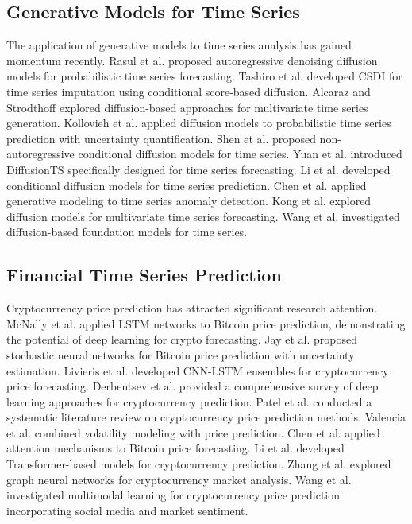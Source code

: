 \documentclass[11pt,a4paper]{article}
\begin{document}
\subsection{Generative Models for Time Series}

The application of generative models to time series analysis has gained momentum recently. Rasul et al. \cite{rasul2021autoregressive} proposed autoregressive denoising diffusion models for probabilistic time series forecasting. Tashiro et al. \cite{tashiro2021csdi} developed CSDI for time series imputation using conditional score-based diffusion. Alcaraz and Strodthoff \cite{alcaraz2023diffusion} explored diffusion-based approaches for multivariate time series generation. Kollovieh et al. \cite{kollovieh2023predict} applied diffusion models to probabilistic time series prediction with uncertainty quantification. Shen et al. \cite{shen2023nondiffusion} proposed non-autoregressive conditional diffusion models for time series. Yuan et al. \cite{yuan2024diffusionts} introduced DiffusionTS specifically designed for time series forecasting. Li et al. \cite{li2024diffusion} developed conditional diffusion models for time series prediction. Chen et al. \cite{chen2024generative} applied generative modeling to time series anomaly detection. Kong et al. \cite{kong2024diffusion} explored diffusion models for multivariate time series forecasting. Wang et al. \cite{wang2024timeseries} investigated diffusion-based foundation models for time series.

\subsection{Financial Time Series Prediction}

Cryptocurrency price prediction has attracted significant research attention. McNally et al. \cite{mcnally2018predicting} applied LSTM networks to Bitcoin price prediction, demonstrating the potential of deep learning for crypto forecasting. Jay et al. \cite{jay2020stochastic} proposed stochastic neural networks for Bitcoin price prediction with uncertainty estimation. Livieris et al. \cite{livieris2020cnn} developed CNN-LSTM ensembles for cryptocurrency price forecasting. Derbentsev et al. \cite{derbentsev2021forecasting} provided a comprehensive survey of deep learning approaches for cryptocurrency prediction. Patel et al. \cite{patel2022systematic} conducted a systematic literature review on cryptocurrency price prediction methods. Valencia et al. \cite{valencia2019price} combined volatility modeling with price prediction. Chen et al. \cite{chen2023bitcoin} applied attention mechanisms to Bitcoin price forecasting. Li et al. \cite{li2023cryptocurrency} developed Transformer-based models for cryptocurrency prediction. Zhang et al. \cite{zhang2023deep} explored graph neural networks for cryptocurrency market analysis. Wang et al. \cite{wang2024multimodal} investigated multimodal learning for cryptocurrency price prediction incorporating social media and market sentiment.
\end{document}
